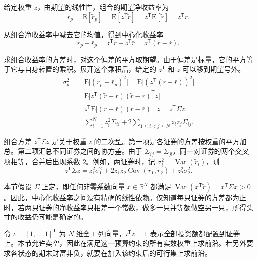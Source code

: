 给定权重 $z$，由期望的线性性，组合的期望净收益率为
\begin{equation*}
 \bar r_p=\mathrm E[\widetilde r_p]
 =\mathrm E[z^{\mathsf T}\widetilde r]
 =z^{\mathsf T}\mathrm E[\widetilde r]
 =z^{\mathsf T}\bar r.
 \tag{12.I}\label{eq:wj-12-portfolio-mean}
\end{equation*}

从组合净收益率中减去它的均值，得到中心化收益率
\[
 \widetilde r_p-\bar r_p
 =z^{\mathsf T}\widetilde r-z^{\mathsf T}\bar r
 =z^{\mathsf T}(\widetilde r-\bar r).
\]

求组合收益率的方差时，对这个偏差的平方取期望。由于偏差是标量，它的平方等于它与自身转置的乘积。展开这个乘积后，给定的 $z^{\mathsf T}$ 和 $z$ 可以移到期望号外。
\begin{equation*}
 \begin{aligned}
 \sigma_p^2
 &=\mathrm E\bigl[(\widetilde r_p-\bar r_p)^2\bigr]
 =\mathrm E\bigl[(z^{\mathsf T}(\widetilde r-\bar r))^2\bigr]\\
 &=\mathrm E\bigl[z^{\mathsf T}(\widetilde r-\bar r)(\widetilde r-\bar r)^{\mathsf T}z\bigr]\\
 &=z^{\mathsf T}\mathrm E\bigl[(\widetilde r-\bar r)(\widetilde r-\bar r)^{\mathsf T}\bigr]z
 =z^{\mathsf T}\Sigma z\\
 &=\sum_{i=1}^N z_i^2\Sigma_{ii}
 +2\sum_{1\le i<j\le N}z_i z_j\Sigma_{ij}.
 \end{aligned}
 \tag{12.II}\label{eq:wj-12-portfolio-variance}
\end{equation*}

组合方差 $z^{\mathsf T}\Sigma z$ 是关于权重 $z$ 的二次型。第一项是各证券的方差按权重的平方加总。第二项汇总不同证券之间的协方差。由于 $\Sigma_{ij}=\Sigma_{ji}$，同一对证券的两个交叉项相等，合并后出现系数 $2$。例如，两证券时，记 $\sigma_i^2=\operatorname{Var}(\widetilde r_i)$，则
\[
 z^{\mathsf T}\Sigma z=z_1^2\sigma_1^2
 +2z_1z_2\operatorname{Cov}(\widetilde r_1,\widetilde r_2)
 +z_2^2\sigma_2^2.
\]

本节假设 $\Sigma$ \hyperlink{wj-positive-definite}{\textcolor{WJReferenceColor}{正定}}，即任何非零系数向量 $x\in\mathbb R^N$ 都满足 $\operatorname{Var}(x^{\mathsf T}\widetilde r)=x^{\mathsf T}\Sigma x>0$。因此，中心化收益率之间没有精确的线性依赖。仅知道每只证券的方差都为正时，若两只证券的净收益率只相差一个常数，做多一只并等额做空另一只，所得头寸的收益仍可能是确定的。

令 $\iota=[1,\ldots,1]^{\mathsf T}$ 为 $N$ 维全 $1$ 列向量，$\iota^{\mathsf T}z=1$ 表示全部投资额都配置到证券上。本节允许卖空，因此在满足这一预算约束的所有实数权重上求前沿。若另外要求各状态的期末财富非负，就要在加入该约束后的可行集上求前沿。

